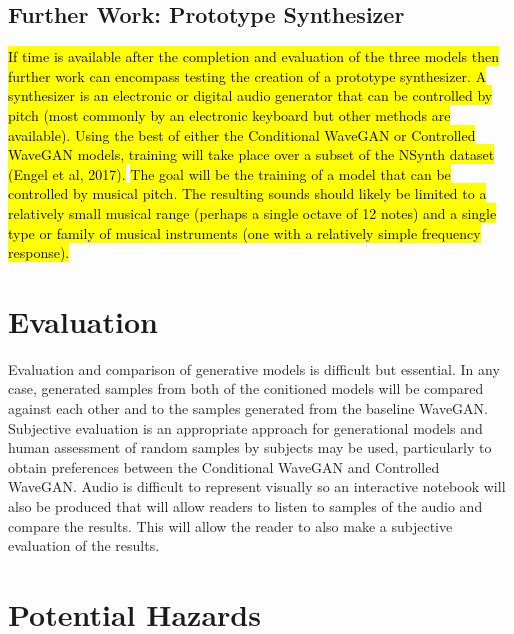 \documentclass{article}
\begin{document}
\subsection{Further Work: Prototype Synthesizer}

\hl{
If time is available after the completion and evaluation of the three models then further work can encompass testing the creation of a prototype synthesizer.
A synthesizer is an electronic or digital audio generator that can be controlled by pitch (most commonly by an electronic keyboard but other methods are available).
Using the best of either the Conditional WaveGAN or Controlled WaveGAN models, training will take place over a subset of the NSynth dataset (Engel et al, 2017).}
\newline
\newline
\hl{
The goal will be the training of a model that can be controlled by musical pitch.
The resulting sounds should likely be limited to a relatively small musical range (perhaps a single octave of 12 notes) and a single type or family of musical instruments (one with a relatively simple frequency response).}

\section{Evaluation}

Evaluation and comparison of generative models is difficult but essential.
In any case, generated samples from both of the conitioned models will be compared against each other and to the samples generated from the baseline WaveGAN.
\newline
\newline
Subjective evaluation is an appropriate approach for generational models and human assessment of random samples by subjects may be used, particularly to obtain preferences between the Conditional WaveGAN and Controlled WaveGAN.
\newline
\newline
Audio is difficult to represent visually so an interactive notebook will also be produced that will allow readers to listen to samples of the audio and compare the results.
This will allow the reader to also make a subjective evaluation of the results.

\section{Potential Hazards}
\end{document}
